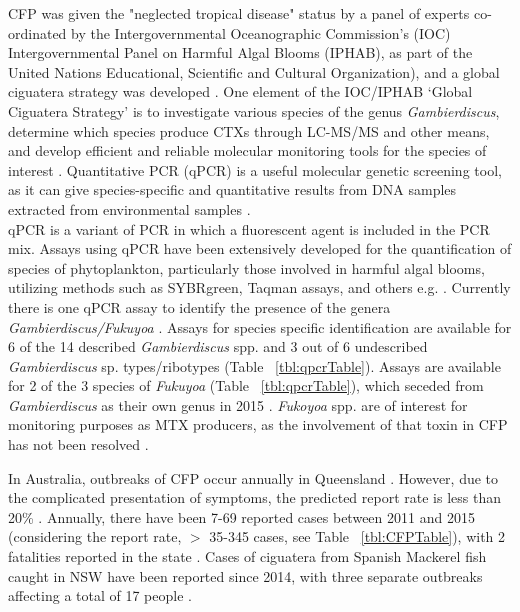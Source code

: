 \documentclass[12pt]{article}
\begin{document}
CFP was given the "neglected tropical disease" status by a panel of experts co-ordinated by the Intergovernmental Oceanographic Commission’s (IOC) Intergovernmental Panel on Harmful Algal Blooms (IPHAB), as part of the United Nations Educational, Scientific and Cultural Organization), and a global ciguatera strategy was developed \citep{globalcig}. 
One element of the IOC/IPHAB ‘Global Ciguatera Strategy’ is to  investigate various species of the genus \emph{Gambierdiscus}, determine which species produce CTXs through LC-MS/MS and other means, and develop efficient and reliable molecular monitoring tools for the species of interest \citep{globalcig}. Quantitative PCR (qPCR) is a useful molecular genetic screening tool, as it can give species-specific and quantitative results from DNA samples extracted from environmental samples \citep{globalcig}. \\

qPCR is a variant of PCR in which a fluorescent agent is included in the PCR mix. Assays using qPCR have been extensively developed for the quantification of species of phytoplankton, particularly those involved in harmful algal blooms, utilizing methods such as SYBRgreen, Taqman assays, and others e.g. \citep{murray2011sxta,antonella2013quantitative,smith2009advantages,nishimura2016quantitative,vandersea2012development,hariganeya2013quantitative}. %
\FloatBarrier
Currently there is one qPCR assay to identify the presence of the genera \emph{Gambierdiscus/Fukuyoa} \citep{smith2017molecular}. Assays for species specific identification are available for 6 of the 14 described \emph{Gambierdiscus} spp. and 3 out of 6 undescribed \emph{Gambierdiscus} sp. types/ribotypes (Table ~\ref{tbl:qpcrTable}). Assays are available for 2 of the 3 species of \emph{Fukuyoa} (Table ~\ref{tbl:qpcrTable}), which seceded from \emph{Gambierdiscus} as their own genus in 2015 \citep{gomez2015fukuyoa}. \textit{Fukoyoa} spp. are of interest for monitoring purposes as MTX producers, as the involvement of that toxin in CFP has not been resolved \citep{kohli2014feeding}.


In Australia, outbreaks of CFP occur annually in Queensland \citep{qldcig}. However, due to the complicated presentation of symptoms, the predicted report rate is less than 20\% \citep{lewis2006ciguatera}. Annually, there have been 7-69 reported cases between 2011 and 2015 (considering the report rate, $>$ 35-345 cases, see Table ~\ref{tbl:CFPTable}), with 2 fatalities reported in the state \citep{tonge1967ciguatera}. Cases of ciguatera from Spanish Mackerel fish caught in NSW have been reported since 2014, with three separate outbreaks affecting a total of 17 people \citep{farrellclinical}.
\end{document}
